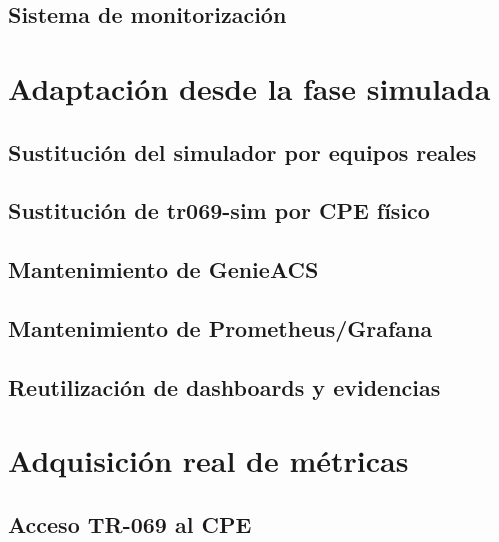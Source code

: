 \subsection{Sistema de monitorización}
\label{subsec:sistema-monitorizacion-real}


\section{Adaptación desde la fase simulada}
\label{sec:adaptacion-desde-fase-simulada}

\subsection{Sustitución del simulador por equipos reales}
\label{subsec:sustitucion-simulador-equipos-reales}

\subsection{Sustitución de tr069-sim por CPE físico}
\label{subsec:sustitucion-tr069-sim-cpe-fisico}

\subsection{Mantenimiento de GenieACS}
\label{subsec:mantenimiento-genieacs}

\subsection{Mantenimiento de Prometheus/Grafana}
\label{subsec:mantenimiento-prometheus-grafana}

\subsection{Reutilización de dashboards y evidencias}
\label{subsec:reutilizacion-dashboards-evidencias}


\section{Adquisición real de métricas}
\label{sec:adquisicion-real-metricas}

\subsection{Acceso TR-069 al CPE}
\label{subsec:acceso-tr069-cpe}


